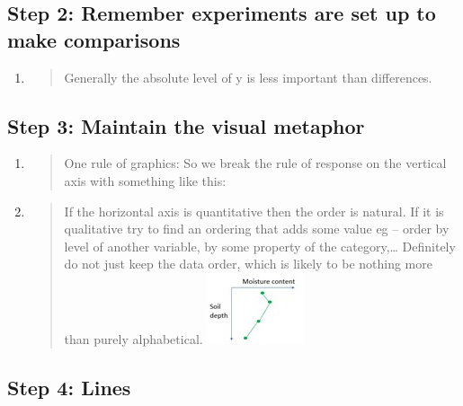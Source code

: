 \documentclass[
]{book}
\begin{document}
\hypertarget{step-2-remember-experiments-are-set-up-to-make-comparisons}{%
\subsection{Step 2: Remember experiments are set up to make comparisons}\label{step-2-remember-experiments-are-set-up-to-make-comparisons}}

\begin{enumerate}
\def\labelenumi{\alph{enumi}.}
\item
  \begin{quote}
  Generally the absolute level of y is less important than differences.
  \end{quote}
\end{enumerate}

\hypertarget{step-3-maintain-the-visual-metaphor}{%
\subsection{Step 3: Maintain the visual metaphor}\label{step-3-maintain-the-visual-metaphor}}

\begin{enumerate}
\def\labelenumi{\alph{enumi}.}
\item
  \begin{quote}
  One rule of graphics: So we break the rule of response on the vertical axis with something like this:
  \end{quote}
\item
  \begin{quote}
  If the horizontal axis is quantitative then the order is natural. If it is qualitative try to find an ordering that adds some value eg -- order by level of another variable, by some property of the category,\ldots{} Definitely do not just keep the data order, which is likely to be nothing more than purely alphabetical.
  \includegraphics{img/Picture6.jpg}
  \end{quote}
\end{enumerate}

\hypertarget{step-4-lines}{%
\subsection{Step 4: Lines}\label{step-4-lines}}
\end{document}
